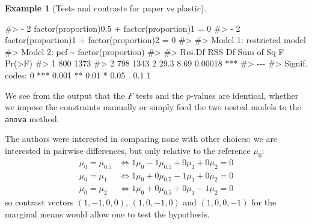 \documentclass[
  11pt,
  letterpaper,
]{scrbook}
\newenvironment{Shaded}{\begin{snugshade}}{\end{snugshade}}
\newcommand{\CommentTok}[1]{\textcolor[rgb]{0.37,0.37,0.37}{#1}}
\theoremstyle{plain}
\theoremstyle{definition}
\newtheorem{example}{Example}[chapter]
\theoremstyle{definition}
\theoremstyle{plain}
\theoremstyle{remark}
\begin{document}
\begin{example}[Tests and contrasts for paper vs
plastic]
\begin{Shaded}
\begin{Highlighting}[]
\CommentTok{\#\textgreater{} {-} 2 factor(proportion)0.5  + factor(proportion)1 = 0}
\CommentTok{\#\textgreater{} {-} 2 factor(proportion)1  + factor(proportion)2 = 0}
\CommentTok{\#\textgreater{} }
\CommentTok{\#\textgreater{} Model 1: restricted model}
\CommentTok{\#\textgreater{} Model 2: pef \textasciitilde{} factor(proportion)}
\CommentTok{\#\textgreater{} }
\CommentTok{\#\textgreater{}   Res.Df  RSS Df Sum of Sq    F  Pr(\textgreater{}F)    }
\CommentTok{\#\textgreater{} 1    800 1373                              }
\CommentTok{\#\textgreater{} 2    798 1343  2      29.3 8.69 0.00018 ***}
\CommentTok{\#\textgreater{} {-}{-}{-}}
\CommentTok{\#\textgreater{} Signif. codes:  0 \textquotesingle{}***\textquotesingle{} 0.001 \textquotesingle{}**\textquotesingle{} 0.01 \textquotesingle{}*\textquotesingle{} 0.05 \textquotesingle{}.\textquotesingle{} 0.1 \textquotesingle{} \textquotesingle{} 1}
\end{Highlighting}
\end{Shaded}

We see from the output that the \(F\) tests and the \(p\)-values are
identical, whether we impose the constraints manually or simply feed the
two nested models to the \texttt{anova} method.

The authors were interested in comparing none with other choices: we are
interested in pairwise differences, but only relative to the reference
\(\mu_{0}\): \begin{align*}
\mu_0 = \mu_{0.5}  & \iff 1\mu_0 - 1\mu_{0.5} + 0\mu_{1} + 0 \mu_{2} = 0\\
\mu_0 = \mu_{1} & \iff 1\mu_0 + 0\mu_{0.5} -1\mu_{1} + 0 \mu_{2} = 0\\
\mu_0 = \mu_{2} & \iff 1\mu_0 + 0\mu_{0.5} + 0\mu_{1} -1 \mu_{2} = 0
\end{align*} so contrast vectors \((1, -1, 0, 0)\), \((1, 0, -1, 0)\)
and \((1, 0, 0, -1)\) for the marginal means would allow one to test the
hypothesis.


\end{example}
\end{document}
